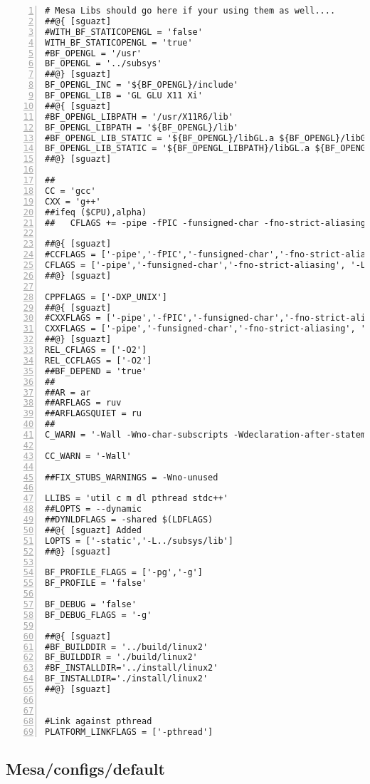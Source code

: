 \begin{lstlisting}[basicstyle={\small\ttfamily},breaklines=true,frame=single,numbers=left]
# Mesa Libs should go here if your using them as well....
##@{ [sguazt]
#WITH_BF_STATICOPENGL = 'false'
WITH_BF_STATICOPENGL = 'true'
#BF_OPENGL = '/usr'
BF_OPENGL = '../subsys'
##@} [sguazt]
BF_OPENGL_INC = '${BF_OPENGL}/include'
BF_OPENGL_LIB = 'GL GLU X11 Xi'
##@{ [sguazt]
#BF_OPENGL_LIBPATH = '/usr/X11R6/lib'
BF_OPENGL_LIBPATH = '${BF_OPENGL}/lib'
#BF_OPENGL_LIB_STATIC = '${BF_OPENGL}/libGL.a ${BF_OPENGL}/libGLU.a ${BF_OPENGL}/libXxf86vm.a ${BF_OPENGL}/libX11.a ${BF_OPENGL}/libXi.a ${BF_OPENGL}/libXext.a ${BF_OPENGL}/libXxf86vm.a'
BF_OPENGL_LIB_STATIC = '${BF_OPENGL_LIBPATH}/libGL.a ${BF_OPENGL_LIBPATH}/libGLU.a'
##@} [sguazt]

##
CC = 'gcc'
CXX = 'g++'
##ifeq ($CPU),alpha)
##   CFLAGS += -pipe -fPIC -funsigned-char -fno-strict-aliasing -mieee

##@{ [sguazt]
#CCFLAGS = ['-pipe','-fPIC','-funsigned-char','-fno-strict-aliasing']
CFLAGS = ['-pipe','-funsigned-char','-fno-strict-aliasing', '-L../subsys/lib', '-I../subsys/include', '-I../subsys/include/python$BF_PYTHON_VERSION', '-static']
##@} [sguazt]

CPPFLAGS = ['-DXP_UNIX']
##@{ [sguazt]
#CXXFLAGS = ['-pipe','-fPIC','-funsigned-char','-fno-strict-aliasing']
CXXFLAGS = ['-pipe','-funsigned-char','-fno-strict-aliasing', '-L../subsys/lib', '-I../subsys/include', '-I../subsys/include/python$BF_PYTHON_VERSION', '-static']
##@} [sguazt]
REL_CFLAGS = ['-O2']
REL_CCFLAGS = ['-O2']
##BF_DEPEND = 'true'
##
##AR = ar
##ARFLAGS = ruv
##ARFLAGSQUIET = ru
##
C_WARN = '-Wall -Wno-char-subscripts -Wdeclaration-after-statement'

CC_WARN = '-Wall'

##FIX_STUBS_WARNINGS = -Wno-unused

LLIBS = 'util c m dl pthread stdc++'
##LOPTS = --dynamic
##DYNLDFLAGS = -shared $(LDFLAGS)
##@{ [sguazt] Added
LOPTS = ['-static','-L../subsys/lib']
##@} [sguazt]

BF_PROFILE_FLAGS = ['-pg','-g']
BF_PROFILE = 'false'

BF_DEBUG = 'false'
BF_DEBUG_FLAGS = '-g'

##@{ [sguazt]
#BF_BUILDDIR = '../build/linux2'
BF_BUILDDIR = './build/linux2'
#BF_INSTALLDIR='../install/linux2'
BF_INSTALLDIR='./install/linux2'
##@} [sguazt]


#Link against pthread
PLATFORM_LINKFLAGS = ['-pthread']
\end{lstlisting}

\subsection{Mesa/configs/default} \label{ssec:blenderfiles-mesadefault}

